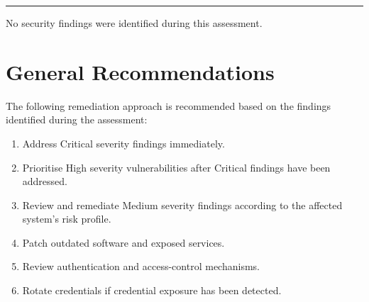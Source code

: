 \documentclass[11pt,a4paper]{article}
\begin{document}
{{{{{{{{{{{{

{%


\vspace{0.5cm}

\hrule

\vspace{0.5cm}


{%


{%

No security findings were identified during this assessment.

{%



\newpage

\section{General Recommendations}

The following remediation approach is recommended based on the
findings identified during the assessment:

\begin{enumerate}

    \item Address Critical severity findings immediately.

    \item Prioritise High severity vulnerabilities after Critical
    findings have been addressed.

    \item Review and remediate Medium severity findings according to
    the affected system's risk profile.

    \item Patch outdated software and exposed services.

    \item Review authentication and access-control mechanisms.

    \item Rotate credentials if credential exposure has been detected.


\end{enumerate}}}}}}}}}}}}}}}}}
\end{document}
